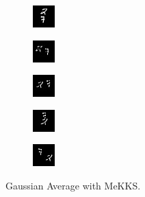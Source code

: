     \begin{subfigure}[t]{0.9\textwidth}
        \centering
        \begin{subfigure}[t]{0.19\textwidth}
            \centering
            \includegraphics[scale=2]{figures/MeKKS-DIFFERENCING/frame0}
        \end{subfigure}
        \hfill
        \begin{subfigure}[t]{0.19\textwidth}
            \centering
            \includegraphics[scale=2]{figures/MeKKS-DIFFERENCING/frame4}
        \end{subfigure}
        \hfill
        \begin{subfigure}[t]{0.19\textwidth}
            \centering
            \includegraphics[scale=2]{figures/MeKKS-DIFFERENCING/frame8}
        \end{subfigure}
        \hfill
        \begin{subfigure}[t]{0.19\textwidth}
            \centering
            \includegraphics[scale=2]{figures/MeKKS-DIFFERENCING/frame12}
        \end{subfigure}
        \hfill
        \begin{subfigure}[t]{0.19\textwidth}
            \centering
            \includegraphics[scale=2]{figures/MeKKS-DIFFERENCING/frame16}
        \end{subfigure}
        \caption{Gaussian Average with MeKKS.}
    \end{subfigure}
